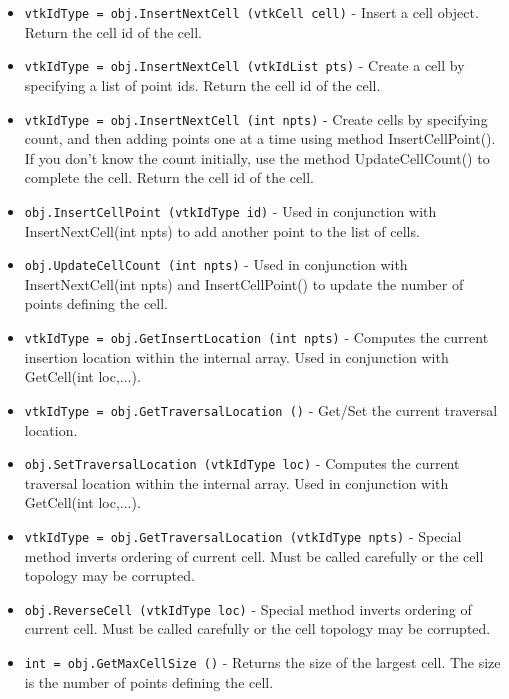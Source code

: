 \begin{itemize}
\item  \verb|vtkIdType = obj.InsertNextCell (vtkCell cell)| -  Insert a cell object. Return the cell id of the cell.

\item  \verb|vtkIdType = obj.InsertNextCell (vtkIdList pts)| -  Create a cell by specifying a list of point ids. Return the cell id of
 the cell.

\item  \verb|vtkIdType = obj.InsertNextCell (int npts)| -  Create cells by specifying count, and then adding points one at a time
 using method InsertCellPoint(). If you don't know the count initially,
 use the method UpdateCellCount() to complete the cell. Return the cell
 id of the cell.

\item  \verb|obj.InsertCellPoint (vtkIdType id)| -  Used in conjunction with InsertNextCell(int npts) to add another point
 to the list of cells.

\item  \verb|obj.UpdateCellCount (int npts)| -  Used in conjunction with InsertNextCell(int npts) and InsertCellPoint() to
 update the number of points defining the cell.

\item  \verb|vtkIdType = obj.GetInsertLocation (int npts)| -  Computes the current insertion location within the internal array. 
 Used in conjunction with GetCell(int loc,...).

\item  \verb|vtkIdType = obj.GetTraversalLocation ()| -  Get/Set the current traversal location.

\item  \verb|obj.SetTraversalLocation (vtkIdType loc)| -  Computes the current traversal location within the internal array. Used 
 in conjunction with GetCell(int loc,...).

\item  \verb|vtkIdType = obj.GetTraversalLocation (vtkIdType npts)| -  Special method inverts ordering of current cell. Must be called
 carefully or the cell topology may be corrupted.

\item  \verb|obj.ReverseCell (vtkIdType loc)| -  Special method inverts ordering of current cell. Must be called
 carefully or the cell topology may be corrupted.

\item  \verb|int = obj.GetMaxCellSize ()| -  Returns the size of the largest cell. The size is the number of points
 defining the cell.


\end{itemize}
